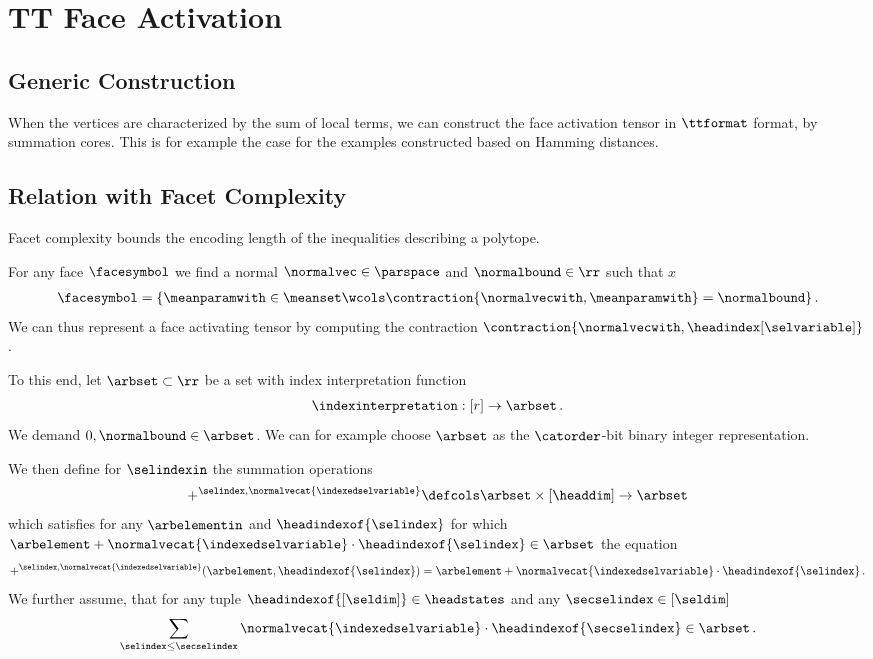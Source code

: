 \section{TT Face Activation}

\subsection{Generic Construction}

When the vertices are characterized by the sum of local terms, we can construct the face activation tensor in $\ttformat$ format, by summation cores.
This is for example the case for the examples constructed based on Hamming distances.

\subsection{Relation with Facet Complexity}

Facet complexity \cite[Definition 6.2.2]{grotschel_geometric_1993} bounds the encoding length of the inequalities describing a polytope.

For any face $\facesymbol$ we find a normal $\normalvec\in\parspace$ and $\normalbound\in\rr$ such that $x$
\begin{align*}
    \facesymbol =
    \{\meanparamwith\in\meanset \wcols \contraction{\normalvecwith,\meanparamwith}=\normalbound \}\, .
\end{align*}
We can thus represent a face activating tensor by computing the contraction $\contraction{\normalvecwith,\headindex[\selvariable]}$.

To this end, let $\arbset\subset\rr$ be a set with index interpretation function
\begin{align*}
    \indexinterpretation : [r] \rightarrow \arbset \, .
\end{align*}
We demand $0,\normalbound\in\arbset$.
We can for example choose $\arbset$ as the $\catorder$-bit binary integer representation.

We then define for $\selindexin$ the summation operations
\begin{align*}
    +^{\selindex,\normalvecat{\indexedselvariable}} \defcols \arbset \times [\headdim] \rightarrow \arbset
\end{align*}
which satisfies for any $\arbelementin$ and $\headindexof{\selindex}$ for which $\arbelement + \normalvecat{\indexedselvariable} \cdot \headindexof{\selindex}\in\arbset$ the equation
\begin{align*}
    +^{\selindex,\normalvecat{\indexedselvariable}}(\arbelement,\headindexof{\selindex})
    = \arbelement + \normalvecat{\indexedselvariable} \cdot \headindexof{\selindex} \, .
\end{align*}
We further assume, that for any tuple $\headindexof{[\seldim]}\in\headstates$ and any $\secselindex\in[\seldim]$
\begin{align*}
    \sum_{\selindex\leq\secselindex} \normalvecat{\indexedselvariable} \cdot \headindexof{\secselindex} \in \arbset \, .
\end{align*}

